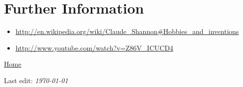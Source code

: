 \documentclass{article}
\def\wl{\par \noindent \vspace{\lineskip}}
\begin{document}
\section{Further Information}
\begin{itemize}
\item \url{http://en.wikipedia.org/wiki/Claude_Shannon#Hobbies_and_inventions}
\item \url{http://www.youtube.com/watch?v=Z86V_ICUCD4}
\end{itemize}
\wl
\href{index.html}{Home}
\wl
Last edit: \emph{\today}
\end{document}
